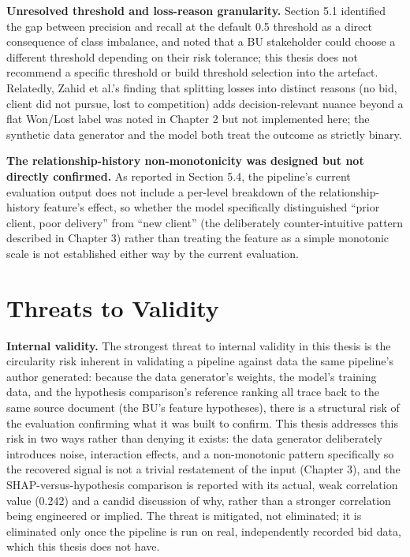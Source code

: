 \documentclass[12pt,oneside]{report}
\begin{document}
\textbf{Unresolved threshold and loss-reason granularity.} Section 5.1
identified the gap between precision and recall at the default 0.5
threshold as a direct consequence of class imbalance, and noted that a
BU stakeholder could choose a different threshold depending on their
risk tolerance; this thesis does not recommend a specific threshold or
build threshold selection into the artefact. Relatedly, Zahid et al.'s
\citeyearpar{zahid2021predicting} finding that splitting losses into
distinct reasons (no bid, client did not pursue, lost to competition)
adds decision-relevant nuance beyond a flat Won/Lost label was noted in
Chapter 2 but not implemented here; the synthetic data generator and the
model both treat the outcome as strictly binary.

\textbf{The relationship-history non-monotonicity was designed but not
directly confirmed.} As reported in Section 5.4, the pipeline's current
evaluation output does not include a per-level breakdown of the
relationship-history feature's effect, so whether the model specifically
distinguished ``prior client, poor delivery'' from ``new client'' (the
deliberately counter-intuitive pattern described in Chapter 3) rather
than treating the feature as a simple monotonic scale is not established
either way by the current evaluation.

\hypertarget{threats-to-validity}{%
\section{Threats to Validity}\label{threats-to-validity}}

\textbf{Internal validity.} The strongest threat to internal validity in
this thesis is the circularity risk inherent in validating a pipeline
against data the same pipeline's author generated: because the data
generator's weights, the model's training data, and the hypothesis
comparison's reference ranking all trace back to the same source
document (the BU's feature hypotheses), there is a structural risk of
the evaluation confirming what it was built to confirm. This thesis
addresses this risk in two ways rather than denying it exists: the data
generator deliberately introduces noise, interaction effects, and a
non-monotonic pattern specifically so the recovered signal is not a
trivial restatement of the input (Chapter 3), and the
SHAP-versus-hypothesis comparison is reported with its actual, weak
correlation value (0.242) and a candid discussion of why, rather than a
stronger correlation being engineered or implied. The threat is
mitigated, not eliminated; it is eliminated only once the pipeline is
run on real, independently recorded bid data, which this thesis does not
have.
\end{document}
